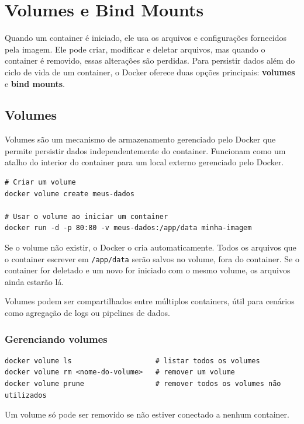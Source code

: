 \section{Volumes e Bind Mounts}

Quando um container é iniciado, ele usa os arquivos e configurações fornecidos pela imagem. Ele pode criar, modificar e deletar arquivos, mas quando o container é removido, essas alterações são perdidas. Para persistir dados além do ciclo de vida de um container, o Docker oferece duas opções principais: \textbf{volumes} e \textbf{bind mounts}.

\subsection{Volumes}

Volumes são um mecanismo de armazenamento gerenciado pelo Docker que permite persistir dados independentemente do container. Funcionam como um atalho do interior do container para um local externo gerenciado pelo Docker.

\begin{verbatim}
# Criar um volume
docker volume create meus-dados

# Usar o volume ao iniciar um container
docker run -d -p 80:80 -v meus-dados:/app/data minha-imagem
\end{verbatim}

Se o volume não existir, o Docker o cria automaticamente. Todos os arquivos que o container escrever em \texttt{/app/data} serão salvos no volume, fora do container. Se o container for deletado e um novo for iniciado com o mesmo volume, os arquivos ainda estarão lá.

Volumes podem ser compartilhados entre múltiplos containers, útil para cenários como agregação de logs ou pipelines de dados.

\subsubsection{Gerenciando volumes}

\begin{verbatim}
docker volume ls                    # listar todos os volumes
docker volume rm <nome-do-volume>   # remover um volume
docker volume prune                 # remover todos os volumes não utilizados
\end{verbatim}

Um volume só pode ser removido se não estiver conectado a nenhum container.

